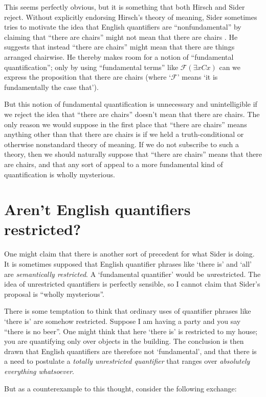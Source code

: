 \documentclass[11pt]{article}
\begin{document}
\begin{spacing}{1.25}
This seems perfectly obvious, but it is something that both Hirsch and
Sider reject.  Without explicitly endorsing Hirsch's theory of
meaning, Sider sometimes tries to motivate the idea that English
quantifiers are ``nonfundamental'' by claiming that ``there are
chairs'' might not mean that there are chairs
\citeyearpar[171]{sider2011d}.  He suggests that instead ``there are
chairs'' might mean that there are things arranged chairwise.  He
thereby makes room for a notion of ``fundamental quantification'';
only by using ``fundamental terms'' like $\mathcal{F} ( \exists x Cx
)$ can we express the proposition that there are chairs (where
`$\mathcal{F}$' means `it is fundamentally the case that').

But this notion of fundamental quantification is unnecessary and
unintelligible if we reject the idea that ``there are chairs'' doesn't
mean that there are chairs.  The only reason we would suppose in the
first place that ``there are chairs'' means anything other than that
there are chairs is if we held a truth-conditional or otherwise
nonstandard theory of meaning.  If we do not subscribe to such a
theory, then we should naturally suppose that ``there are chairs''
means that there are chairs, and that any sort of appeal to a more
fundamental kind of quantification is wholly mysterious.

\section{Aren't English quantifiers restricted?}
\label{eng-quant}
One might claim that there is another sort of precedent for what Sider
is doing.  It is sometimes supposed that English quantifier phrases
like `there is' and `all' are {\em semantically restricted}.  A
`fundamental quantifier' would be {\em un}restricted.  The idea of
unrestricted quantifiers is perfectly sensible, so I cannot claim that
Sider's proposal is ``wholly mysterious''.  

There is some temptation to think that ordinary uses of quantifier
phrases like `there is' are somehow restricted.  Suppose I am having a
party and you say ``there is no beer''.  One might think that here
`there is' is restricted to my house; you are quantifying only over
objects in the building.  The conclusion is then drawn that English
quantifiers are therefore not `fundamental', and that there is a need
to postulate a {\em totally unrestricted quantifier} that ranges over
{\em absolutely everything whatsoever}.

But as a counterexample to this thought, consider the following
exchange:


\end{spacing}
\end{document}
